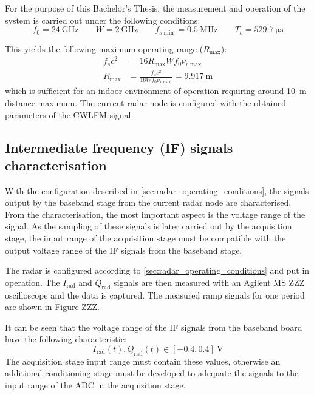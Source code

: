For the purpose of this Bachelor's Thesis, the measurement and operation of the system is carried out under the following conditions:
\begin{equation} \label{eq:if_conditions}
	f_0 = \SI{24}{\giga\hertz} \qquad W = \SI{2}{\giga\hertz} \qquad f_{s\min} = \SI{0.5}{\mega\hertz} \qquad T_c = \SI{529.7}{\micro\second}
\end{equation}

This yields the following maximum operating range ($R_{\max}$):
\begin{align}
	f_s c^2 &= 16 R_{\max}W f_0 \nu_{r\max} \\
	R_{\max} &= \frac{f_s c^2}{16 W f_0 \nu_{r\max}} = \SI{9.917}{\meter}
\end{align}
which is sufficient for an indoor environment of operation requiring around \SI{10}{\meter} distance maximum. The current radar node is configured with the obtained parameters of the CWLFM signal.

\subsection{Intermediate frequency (IF) signals characterisation} \label{sec:if_signals_characterisation}

With the configuration described in \cref{sec:radar_operating_conditions}, the signals output by the baseband stage from the current radar node are characterised. From the characterisation, the most important aspect is the voltage range of the signal. As the sampling of these signals is later carried out by the acquisition stage, the input range of the acquisition stage must be compatible with the output voltage range of the IF signals from the baseband stage.

The radar is configured according to \cref{sec:radar_operating_conditions} and put in operation. The $I_\mathrm{rad}$ and $Q_\mathrm{rad}$ signals are then measured with an Agilent MS ZZZ oscilloscope and the data is captured. The measured ramp signals for one period are shown in Figure ZZZ.

It can be seen that the voltage range of the IF signals from the baseband board have the following characteristic:
\begin{equation} \label{eqn:iq_volts}
	I_\mathrm{rad}(t), Q_\mathrm{rad}(t) \in [-0.4, 0.4]\ \si{\volt}
\end{equation}
The acquisition stage input range must contain these values, otherwise an additional conditioning stage must be developed to adequate the signals to the input range of the ADC in the acquisition stage.

